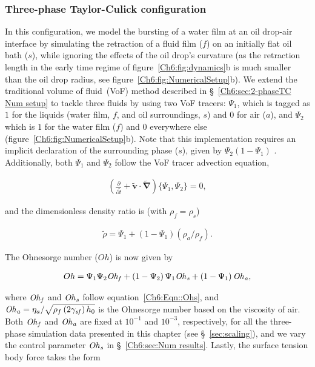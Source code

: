 \subsubsection{Three-phase Taylor-Culick configuration}\label{Ch6:sec:3-phaseTC Num methods}
In this configuration, we model the bursting of a water film at an oil drop-air interface by simulating the retraction of a fluid film ($f$) on an initially flat oil bath ($s$), while ignoring the effects of the oil drop's curvature (as the retraction length in the early time regime of figure~\ref{Ch6:fig:dynamics}b is much smaller than the oil drop radius, see figure~\ref{Ch6:fig:NumericalSetup}b). We extend the traditional volume of fluid~(VoF) method described in \S~\ref{Ch6:sec:2-phaseTC Num setup} to tackle three fluids by using two VoF tracers: $\Psi_1$, which is tagged as $1$ for the liquids (water film,  $f$, and oil surroundings,  $s$) and $0$ for air ($a$), and $\Psi_2$ which is $1$ for the water film ($f$) and $0$ everywhere else (figure~\ref{Ch6:fig:NumericalSetup}b). Note that this implementation requires an implicit declaration of the surrounding phase ($s$), given by $\Psi_2\left(1-\Psi_1\right)$ \citep{sanjay2019droplet, vatsal-basilisk-3p, basiliskvatsaltc, mou2021singular}. Additionally, both $\Psi_1$ and $\Psi_2$ follow the VoF tracer advection equation,

\begin{align}
	\label{Ch6:Eqn::Vof2}
	\left(\frac{\partial}{\partial\tilde{t}} + \boldsymbol{\tilde{v}\cdot\tilde{\nabla}}\right)\{\Psi_1, \Psi_2\} = 0,
\end{align}

\noindent and the dimensionless density ratio is (with $\rho_f = \rho_s$)

\begin{align}
	\label{Ch6:Eqn::density3}
	\tilde{\rho} = \Psi_1 + \left(1-\Psi_1\right)\left(\rho_a/\rho_f\right).
\end{align}

\noindent The Ohnesorge number ($Oh$) is now given by

\begin{align}
	\label{Ch6:Eqn::Oh3}
	Oh = \Psi_1\Psi_2\mathit{Oh}_\mathit{f} + \left(1-\Psi_2\right)\Psi_1\mathit{Oh}_\mathit{s} + \left(1-\Psi_1\right)\mathit{Oh}_\mathit{a},
\end{align}

\noindent where $\mathit{Oh}_\mathit{f}$ and $\mathit{Oh}_\mathit{s}$ follow equation~\eqref{Ch6:Eqn::Ohs}, and $\mathit{Oh}_\mathit{a} = \eta_a/\sqrt{\rho_f\left(2\gamma_\mathit{sf}\right)h_0}$ is the Ohnesorge number based on the viscosity of air. Both $\mathit{Oh}_\mathit{f}$ and $\mathit{Oh}_\mathit{a}$ are fixed at $10^{-1}$ and $10^{-3}$, respectively, for all the three-phase simulation data presented in this chapter (see \S~\ref{sec:scaling}), and we vary the control parameter $\mathit{Oh}_\mathit{s}$ in \S~\ref{Ch6:sec:Num results}. Lastly, the surface tension body force takes the form

